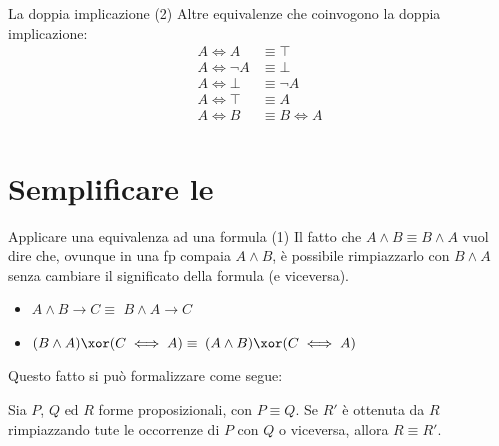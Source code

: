 \documentclass[10pt,dvipsnames]{beamer}
\begin{document}
\begin{frame}{La doppia implicazione (2)}
    Altre equivalenze che coinvogono la doppia implicazione:
    \begin{align*}
        A \iff A      & \equiv \top     \\
        A \iff \neg A & \equiv \bot     \\
        A \iff \bot   & \equiv \neg A   \\
        A \iff \top   & \equiv A        \\
        A \iff B      & \equiv B \iff A \\
    \end{align*}
\end{frame}


\section{Semplificare le \fp}

\begin{frame}{Applicare una equivalenza ad una formula (1)}
    Il fatto che $A \wedge B \equiv B \wedge A$ vuol dire che, ovunque in una fp compaia $A \wedge B$, è possibile rimpiazzarlo con $B \wedge A$ senza cambiare il significato della formula (e viceversa).
    \begin{itemize}
        \item $A \wedge B \to C \equiv$ \pause $B \wedge A \to C$ \pause\
        \item $(B \wedge A) \xor (C \iff A) \equiv$ \pause $(A \wedge B) \xor (C \iff A)$
    \end{itemize}

    \pause\medskip
    Questo fatto si può formalizzare come segue:
    \begin{theorem}
        Sia $P$, $Q$ ed $R$ forme proposizionali, con $P \equiv Q$. Se $R'$ è ottenuta da $R$ rimpiazzando tute le occorrenze di $P$ con $Q$ o viceversa, allora $R \equiv R'$.
    \end{theorem}
\end{frame}
\end{document}
